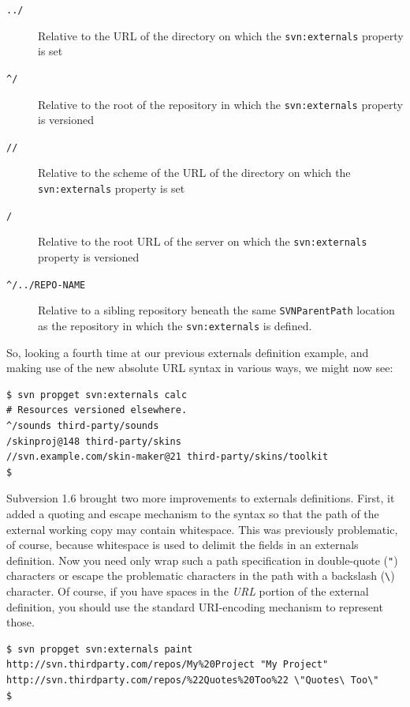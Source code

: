 \protect{}\label{svn.advanced.externals.urlmagic}{}

\begin{description}
\item[\texttt{../}]
Relative to the URL of the directory on which the \texttt{svn:externals}
property is set
\item[\texttt{\^{}/}]
Relative to the root of the repository in which the
\texttt{svn:externals} property is versioned
\item[\texttt{//}]
Relative to the scheme of the URL of the directory on which the
\texttt{svn:externals} property is set
\item[\texttt{/}]
Relative to the root URL of the server on which the
\texttt{svn:externals} property is versioned
\item[\texttt{\^{}/../REPO-NAME}]
Relative to a sibling repository beneath the same \texttt{SVNParentPath}
location as the repository in which the \texttt{svn:externals} is
defined.
\end{description}

So, looking a fourth time at our previous externals definition example,
and making use of the new absolute URL syntax in various ways, we might
now see:

\begin{verbatim}
$ svn propget svn:externals calc
# Resources versioned elsewhere.
^/sounds third-party/sounds
/skinproj@148 third-party/skins
//svn.example.com/skin-maker@21 third-party/skins/toolkit
$
\end{verbatim}

Subversion 1.6 brought two more improvements to externals definitions.
First, it added a quoting and escape mechanism to the syntax so that the
path of the external working copy may contain whitespace. This was
previously problematic, of course, because whitespace is used to delimit
the fields in an externals definition. Now you need only wrap such a
path specification in double-quote (\texttt{"}) characters or escape the
problematic characters in the path with a backslash
(\texttt{\textbackslash{}}) character. Of course, if you have spaces in
the \emph{URL} portion of the external definition, you should use the
standard URI-encoding mechanism to represent those.

\begin{verbatim}
$ svn propget svn:externals paint
http://svn.thirdparty.com/repos/My%20Project "My Project"
http://svn.thirdparty.com/repos/%22Quotes%20Too%22 \"Quotes\ Too\"
$
\end{verbatim}

